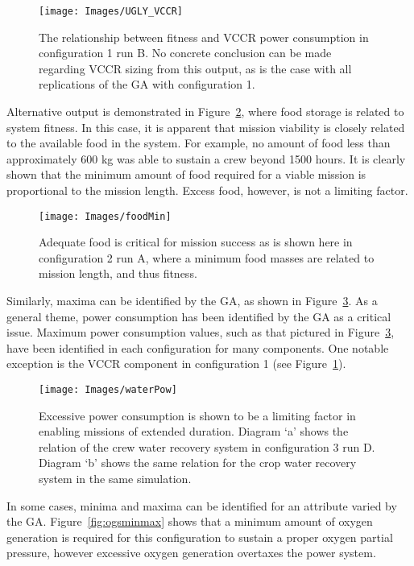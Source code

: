 \documentclass[submit]{aiaa}
\begin{document}
\begin{figure}[htb]
\texttt{[image: Images/UGLY\_VCCR]}
\caption{The relationship between fitness and VCCR power consumption
  in configuration 1 run B. No concrete conclusion can be made regarding VCCR
  sizing from this output, as is the case with all replications of the
  GA with configuration 1.} 
\label{fig:uglyVCCR}
\end{figure}

Alternative output is demonstrated in Figure~\ref{fig:foodMin}, where
food storage is related to system fitness. 
In this case,  it is apparent that mission viability is closely related to the available food in the system. 
For example, no amount of food less than approximately 600 kg was able to sustain a crew beyond 1500 hours.  
It is clearly shown that the minimum amount of food required
for a viable mission is proportional to the mission length. Excess
food, however, is not a limiting factor. 

\begin{figure}[htb]
\texttt{[image: Images/foodMin]}
\caption{Adequate food is critical for mission success as is shown
  here in configuration 2 run A, where a minimum food masses are
  related to mission  length, and thus fitness.} 
\label{fig:foodMin}
\end{figure}

Similarly, maxima can be identified by the GA, as shown in Figure~\ref{fig:waterRS}.  
As a general theme, power consumption has been identified by the GA as a critical issue. 
Maximum power consumption values, such as that pictured in
Figure~\ref{fig:waterRS}, have been identified in each configuration
for many components.  
One notable exception is the VCCR component in configuration 1 (see Figure~\ref{fig:uglyVCCR}).

\begin{figure}[htb]
\texttt{[image: Images/waterPow]}
\caption{Excessive power consumption is shown to be a limiting
  factor in enabling missions of extended duration. Diagram `a' shows
  the relation of the crew water recovery system in configuration 3
  run D. Diagram `b' shows the same relation for the crop 
water recovery system  in the same simulation.}
\label{fig:waterRS}
\end{figure}

In some cases, minima and maxima can be identified for an attribute
varied by the GA. Figure~\ref{fig:ogsminmax} shows that a minimum
amount of oxygen generation is required for this configuration to
sustain a proper oxygen partial pressure, however excessive
oxygen generation overtaxes the power system.
\end{document}

